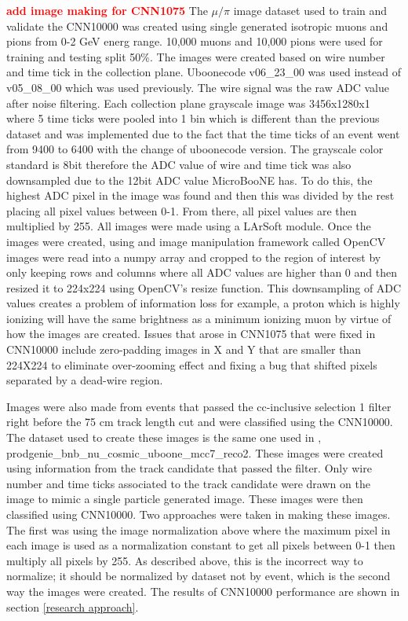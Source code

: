 \textcolor{red}{\textbf{add image making for CNN1075}}
The $\mu/\pi$ image dataset used to train and validate the CNN10000 was created using single generated isotropic muons and pions from 0-2 GeV energ range. 10,000 muons and 10,000 pions were used for training and testing split 50\%. The images were created based on wire number and time tick in the collection plane. Uboonecode v06{\_}23{\_}00 was used instead of v05{\_}08{\_}00 which was used previously. The wire signal was the raw ADC value after noise filtering. Each collection plane grayscale image was 3456x1280x1 where 5 time ticks were pooled into 1 bin which is different than the previous dataset and was implemented due to the fact that the time ticks of an event went from 9400 to 6400 with the change of uboonecode version. The grayscale color standard is 8bit therefore the ADC value of wire and time tick was also downsampled due to the 12bit ADC value MicroBooNE has. To do this, the highest ADC pixel in the image was found and then this was divided by the rest placing all pixel values between 0-1. From there, all pixel values are then multiplied by 255. All images were made using a LArSoft module. Once the images were created, using and image manipulation framework called OpenCV images were read into a numpy array and cropped to the region of interest by only keeping rows and columns where all ADC values are higher than 0 and then resized it to 224x224 using OpenCV's resize function. This downsampling of ADC values creates a problem of information loss for example, a proton which is highly ionizing will have the same brightness as a minimum ionizing muon by virtue of how the images are created. 
Issues that arose in CNN1075 that were fixed in CNN10000 include zero-padding images in X and Y that are smaller than 224X224 to eliminate over-zooming effect and fixing a bug that shifted pixels separated by a dead-wire region. 

Images were also made from events that passed the cc-inclusive selection 1 filter right before the 75 cm track length cut and were classified using the CNN10000. The dataset used to create these images is the same one used in \cite{cc-inclusive}, prodgenie{\_}bnb{\_}nu{\_}cosmic{\_}uboone{\_}mcc7{\_}reco2. These images were created using information from the track candidate that passed the filter. Only wire number and time ticks associated to the track candidate were drawn on the image to mimic a single particle generated image. These images were then classified using CNN10000. Two approaches were taken in making these images. The first was using the image normalization above where the maximum pixel in each image is used as a normalization constant to get all pixels between 0-1 then multiply all pixels by 255. As described above, this is the incorrect way to normalize; it should be normalized by dataset not by event, which is the second way the images were created. The results of CNN10000 performance are shown in section \ref{research approach}. 

